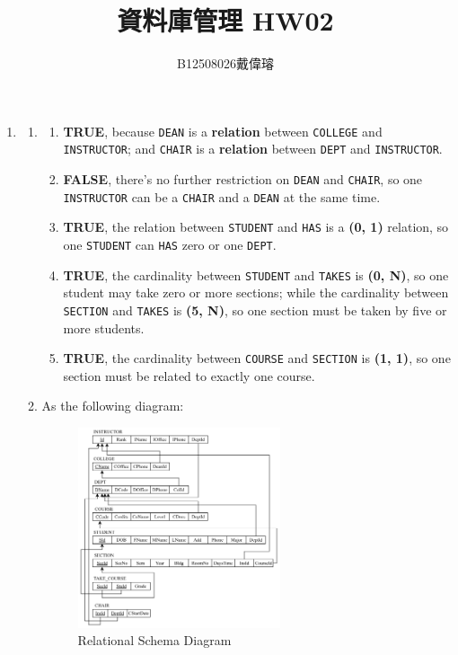 \documentclass[12pt,a4paper]{article}
\title{資料庫管理 HW02}
\author{B12508026戴偉璿}
\date{}
\begin{document}
\maketitle


\begin{enumerate}
    \item
    \begin{enumerate}
        \item
        \begin{enumerate}
            \item \textbf{TRUE}, because \texttt{DEAN} is a \textbf{relation} between \texttt{COLLEGE} and \texttt{INSTRUCTOR}; and \texttt{CHAIR} is a \textbf{relation} between \texttt{DEPT} and \texttt{INSTRUCTOR}.
            \item \textbf{FALSE}, there's no further restriction on \texttt{DEAN} and \texttt{CHAIR}, so one \texttt{INSTRUCTOR} can be a \texttt{CHAIR} and a \texttt{DEAN} at the same time.
            \item \textbf{TRUE}, the relation between \texttt{STUDENT} and \texttt{HAS} is a \textbf{(0, 1)} relation, so one \texttt{STUDENT} can \texttt{HAS} zero or one \texttt{DEPT}.
            \item \textbf{TRUE}, the cardinality between \texttt{STUDENT} and \texttt{TAKES} is \textbf{(0, N)}, so one student may take zero or more sections; while the cardinality between \texttt{SECTION} and \texttt{TAKES} is \textbf{(5, N)}, so one section must be taken by five or more students.
            \item \textbf{TRUE}, the cardinality between \texttt{COURSE} and \texttt{SECTION} is \textbf{(1, 1)}, so one section must be related to exactly one course.
        \end{enumerate}
        \item As the following diagram:
        
        \begin{figure}[H]
            \centering
            \includegraphics[width=0.6\textwidth]{src/1B.png}
            \caption{Relational Schema Diagram}
            \label{fig:ER_diagram}
        \end{figure}


\end{enumerate}
\end{enumerate}
\end{document}
